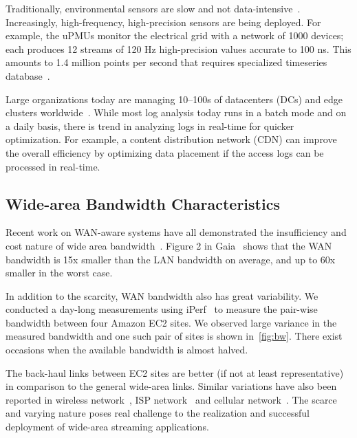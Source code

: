  Traditionally, environmental sensors are slow
and not data-intensive~\cite{atzori2010internet}. Increasingly, high-frequency,
high-precision sensors are being deployed. For example, the uPMUs monitor the
electrical grid with a network of 1000 devices; each produces 12 streams of 120
Hz high-precision values accurate to 100 ns. This amounts to 1.4 million points
per second that requires specialized timeseries
database~\cite{andersen2016btrdb}.

 Large organizations today are managing 10--100s of
datacenters (DCs) and edge clusters worldwide~\cite{calder2013mapping}. While
most log analysis today runs in a batch mode and on a daily basis, there is
trend in analyzing logs in real-time for quicker optimization. For example, a
content distribution network (CDN) can improve the overall efficiency by
optimizing data placement if the access logs can be processed in real-time.


\subsection{Wide-area Bandwidth Characteristics}
\label{sec:wide-area-bandwidth}

Recent work on WAN-aware systems have all demonstrated the insufficiency and
cost nature of wide area bandwidth~\cite{pu2015low, vulimiri2015global}. Figure
2 in Gaia~\cite{hsieh17gaia} shows that the WAN bandwidth is 15x smaller than
the LAN bandwidth on average, and up to 60x smaller in the worst case.

In addition to the scarcity, WAN bandwidth also has great variability. We
conducted a day-long measurements using iPerf~\cite{iperf3} to measure the
pair-wise bandwidth between four Amazon EC2 sites. We observed large variance in
the measured bandwidth and one such pair of sites is shown
in~\autoref{fig:bw}. There exist occasions when the available bandwidth is
almost halved.

The back-haul links between EC2 sites are better (if not at least
representative) in comparison to the general wide-area links. Similar variations
have also been reported in wireless network~\cite{biswas2015large}, ISP
network~\cite{grover2013peeking} and cellular
network~\cite{nikravesh2014mobile}. The scarce and varying nature poses real
challenge to the realization and successful deployment of wide-area streaming
applications.

